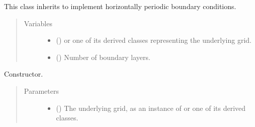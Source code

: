 \documentclass[letterpaper,10pt,english]{sphinxmanual}
\begin{document}

\begin{fulllineitems}
\label{\detokenize{api:tasmania.dycore.horizontal_boundary_periodic.Periodic}}
This class inherits {\hyperref[\detokenize{api:tasmania.dycore.horizontal_boundary.HorizontalBoundary}]{}} to implement horizontally
periodic boundary conditions.
\begin{quote}\begin{description}
\item[{Variables}] \leavevmode\begin{itemize}
\item {} 
 () \textendash{} {\hyperref[\detokenize{api:tasmania.grids.grid_xyz.GridXYZ}]{}} or one of its derived classes representing the underlying grid.

\item {} 
{\hyperref[\detokenize{api:tasmania.dycore.prognostic_isentropic.PrognosticIsentropic.nb}]{}} () \textendash{} Number of boundary layers.

\end{itemize}

\end{description}\end{quote}

\begin{fulllineitems}
\label{\detokenize{api:tasmania.dycore.horizontal_boundary_periodic.Periodic.__init__}}
Constructor.
\begin{quote}\begin{description}
\item[{Parameters}] \leavevmode\begin{itemize}
\item {} 
 () \textendash{} The underlying grid, as an instance of {\hyperref[\detokenize{api:tasmania.grids.grid_xyz.GridXYZ}]{}} or one of its derived classes.


\end{itemize}
\end{description}
\end{quote}
\end{fulllineitems}
\end{fulllineitems}
\end{document}
